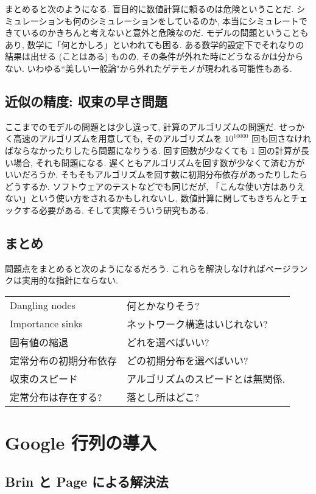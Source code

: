 \documentclass[openany, a4paper, oneside]{jsbook}
\begin{document}
まとめると次のようになる.
盲目的に数値計算に頼るのは危険ということだ.
シミュレーションも何のシミュレーションをしているのか,
本当にシミュレートできているのかきちんと考えないと意外と危険なのだ.
モデルの問題ということもあり, 数学に「何とかしろ」といわれても困る.
ある数学的設定下でそれなりの結果は出せる (ことはある) ものの,
その条件が外れた時にどうなるかは分からない.
いわゆる``美しい一般論"から外れたゲテモノが現われる可能性もある.
\subsection{近似の精度: 収束の早さ問題}

ここまでのモデルの問題とは少し違って, 計算のアルゴリズムの問題だ.
せっかく高速のアルゴリズムを用意しても,
そのアルゴリズムを $10^{10000}$ 回も回さなければならなかったりしたら問題になりうる.
回す回数が少なくても 1 回の計算が長い場合, それも問題になる.
遅くともアルゴリズムを回す数が少なくて済む方がいいだろうか.
そもそもアルゴリズムを回す数に初期分布依存があったりしたらどうするか.
ソフトウェアのテストなどでも同じだが,
「こんな使い方はありえない」という使い方をされるかもしれないし,
数値計算に関してもきちんとチェックする必要がある.
そして実際そういう研究もある.
\subsection{まとめ}

問題点をまとめると次のようになるだろう.
これらを解決しなければページランクは実用的な指針にならない.
\begin{center}
\begin{tabular}{ll}
Dangling nodes & 何とかなりそう?\\
Importance sinks & ネットワーク構造はいじれない?\\
固有値の縮退 & どれを選べばいい?\\
定常分布の初期分布依存 & どの初期分布を選べばいい?\\
収束のスピード & アルゴリズムのスピードとは無関係.\\
定常分布は存在する? & 落とし所はどこ?\\
\end{tabular}
\end{center}
\section{Google 行列の導入}

\subsection{Brin と Page による解決法}
\end{document}
